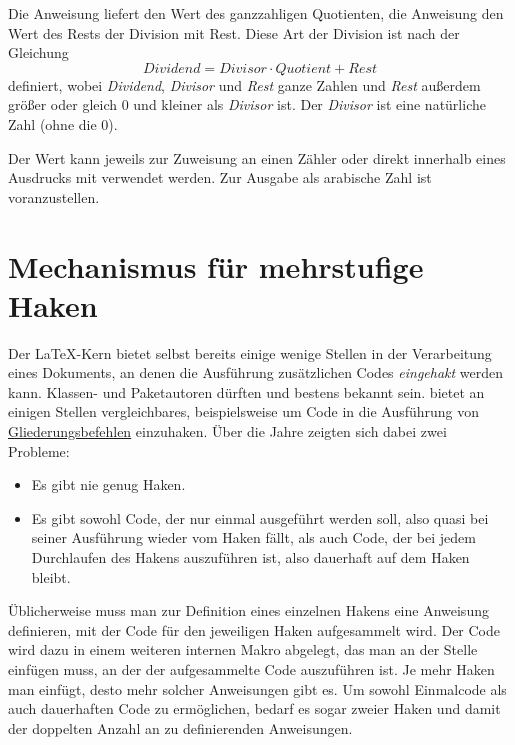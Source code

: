 \begin{Declaration}
\end{Declaration}%
%
%
Die Anweisung  liefert den
Wert des ganzzahligen Quotienten, die Anweisung  den Wert des
Rests der Division mit Rest. Diese Art der Division ist nach der Gleichung
\[
\textit{Dividend} = \textit{Divisor} \cdot
\textit{Quotient} + \textit{Rest}
\]
%
definiert, wobei \textit{Dividend}, \textit{Divisor} und \textit{Rest} ganze
Zahlen und \textit{Rest} außerdem größer oder gleich 0 und kleiner als
\textit{Divisor} ist. Der \textit{Divisor} ist eine natürliche Zahl (ohne die
0).

Der Wert kann jeweils zur Zuweisung an einen Zähler oder direkt innerhalb
eines Ausdrucks mit  verwendet werden. Zur
Ausgabe als arabische Zahl ist  voranzustellen.%
%
\EndIndexGroup


\section[{Mechanismus für mehrstufige Haken}]
{Mechanismus für mehrstufige
  Haken}

\BeginIndexGroup
{}
Der \LaTeX-Kern bietet selbst bereits einige wenige Stellen in der
Verarbeitung eines Dokuments, an denen die Ausführung zusätzlichen Codes
\emph{eingehakt} werden kann. Klassen- und Paketautoren dürften
 und  bestens bekannt
sein. \KOMAScript{} bietet an einigen Stellen vergleichbares, beispielsweise
um Code in die Ausführung von
\hyperref[sec:maincls.structure]{Gliederungsbefehlen} einzuhaken. Über die
Jahre zeigten sich dabei zwei Probleme:
\begin{itemize}
\item Es gibt nie genug Haken.
\item Es gibt sowohl Code, der nur einmal ausgeführt werden soll, also quasi
  bei seiner Ausführung wieder vom Haken fällt, als auch Code, der bei jedem
  Durchlaufen des Hakens auszuführen ist, also dauerhaft auf dem Haken bleibt.
\end{itemize}
Üblicherweise muss man zur Definition eines einzelnen Hakens eine Anweisung
definieren, mit der Code für den jeweiligen Haken aufgesammelt wird. Der Code
wird dazu in einem weiteren internen Makro abgelegt, das man an der Stelle
einfügen muss, an der der aufgesammelte Code auszuführen ist. Je mehr Haken
man einfügt, desto mehr solcher Anweisungen gibt es. Um sowohl Einmalcode als
auch dauerhaften Code zu ermöglichen, bedarf es sogar zweier Haken und damit
der doppelten Anzahl an zu definierenden Anweisungen.

